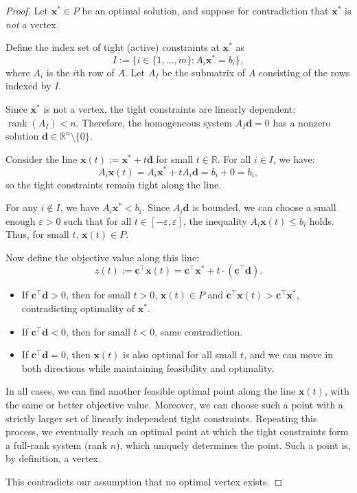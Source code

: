 \begin{proof}
Let \( \mathbf{x}^* \in P \) be an optimal solution, and suppose for contradiction that \( \mathbf{x}^* \) is \emph{not} a vertex.

Define the index set of tight (active) constraints at \( \mathbf{x}^* \) as
\[
I := \{ i \in \{1, \dots, m\} : A_i \mathbf{x}^* = b_i \},
\]
where \( A_i \) is the $i$th row of \( A \). Let \( A_I \) be the submatrix of \( A \) consisting of the rows indexed by \( I \).

Since \( \mathbf{x}^* \) is not a vertex, the tight constraints are linearly dependent: \( \operatorname{rank}(A_I) < n \). Therefore, the homogeneous system \( A_I \mathbf{d} = 0 \) has a nonzero solution \( \mathbf{d} \in \mathbb{R}^n \setminus \{0\} \).

Consider the line \( \mathbf{x}(t) := \mathbf{x}^* + t \mathbf{d} \) for small \( t \in \mathbb{R} \). For all \( i \in I \), we have:
\[
A_i \mathbf{x}(t) = A_i \mathbf{x}^* + t A_i \mathbf{d} = b_i + 0 = b_i,
\]
so the tight constraints remain tight along the line.

For any \( i \notin I \), we have \( A_i \mathbf{x}^* < b_i \). Since \( A_i \mathbf{d} \) is bounded, we can choose a small enough \( \varepsilon > 0 \) such that for all \( t \in [-\varepsilon, \varepsilon] \), the inequality \( A_i \mathbf{x}(t) \leq b_i \) holds. Thus, for small \( t \), \( \mathbf{x}(t) \in P \).

Now define the objective value along this line: 
\[
z(t) := \mathbf{c}^\top \mathbf{x}(t) = \mathbf{c}^\top \mathbf{x}^* + t \cdot (\mathbf{c}^\top \mathbf{d}).
\]

\begin{itemize}
\item If \( \mathbf{c}^\top \mathbf{d} > 0 \), then for small \( t > 0 \), \( \mathbf{x}(t) \in P \) and \( \mathbf{c}^\top \mathbf{x}(t) > \mathbf{c}^\top \mathbf{x}^* \), contradicting optimality of \( \mathbf{x}^* \).
\item If \( \mathbf{c}^\top \mathbf{d} < 0 \), then for small \( t < 0 \), same contradiction.
\item If \( \mathbf{c}^\top \mathbf{d} = 0 \), then \( \mathbf{x}(t) \) is also optimal for all small \( t \), and we can move in both directions while maintaining feasibility and optimality.
\end{itemize}

In all cases, we can find another feasible optimal point along the line \( \mathbf{x}(t) \), with the same or better objective value. Moreover, we can choose such a point with a strictly larger set of linearly independent tight constraints. Repeating this process, we eventually reach an optimal point at which the tight constraints form a full-rank system (rank \( n \)), which uniquely determines the point. Such a point is, by definition, a vertex.

This contradicts our assumption that no optimal vertex exists.
\end{proof}


